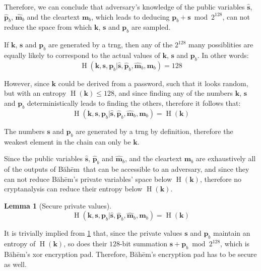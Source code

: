 \documentclass[twocolumn,hidelinks]{article}
\newcommand{\baheem}{Băhēm}
\DeclareMathOperator{\entropy}{H}
\newtheorem{lemma}{Lemma}
\begin{document}
Therefore, we can conclude that adversary's knowledge of the public
variables $\mathbf{\hat s}$, $\mathbf{\hat p}_b$, $\mathbf{\hat m}_b$ and
the cleartext $\mathbf{m}_b$, which leads to deducing $\mathbf{p}_b +
\mathbf{s} \bmod{2^{128}}$, can not reduce the space from which
$\mathbf{k}$, $\mathbf{s}$ and $\mathbf{p}_b$ are sampled.

If $\mathbf{k}$, $\mathbf{s}$ and $\mathbf{p}_b$ are generated by a
\gls{trng}, then any of the $2^{128}$ many possiblities are equally likely
to correspond to the actual values of $\mathbf{k}$, $\mathbf{s}$ and
$\mathbf{p}_b$.  In other words:
\[
    \entropy(\mathbf{k},\mathbf{s},\mathbf{p}_b
        | \mathbf{\hat s},
          \mathbf{\hat p}_b,
          \mathbf{\hat m}_b,
          \mathbf{m}_b
    )
    = 128
\]

However, since $\mathbf{k}$ could be derived from a password, such that it
looks random, but with an entropy $\entropy(\mathbf{k}) \le 128$, and since
finding any of the numbers $\mathbf{k}$, $\mathbf{s}$ and $\mathbf{p}_b$
deterministically leads to finding the others, therefore it follows that:
\[
    \entropy(\mathbf{k},\mathbf{s},\mathbf{p}_b
        | \mathbf{\hat s},
          \mathbf{\hat p}_b,
          \mathbf{\hat m}_b,
          \mathbf{m}_b
    )
    = \entropy(\mathbf{k})
\]

The numbers $\mathbf{s}$ and $\mathbf{p}_b$ are generated by a \gls{trng}
by definition, therefore the weakest element in the chain can only be
$\mathbf{k}$.

Since the public variables $\mathbf{\hat s}$, $\mathbf{\hat p}_b$ and
$\mathbf{\hat m}_b$, and the cleartext $\mathbf{m}_b$ are exhaustively all
of the outputs of \baheem\ that can be accessible to an adversary, and
since they can not reduce \baheem's private variables' space below
$\entropy(\mathbf{k})$, therefore no cryptanalysis can reduce their entropy
below $\entropy(\mathbf{k})$.

\begin{lemma}[Secure private values]
    \[
        \entropy(\mathbf{k},\mathbf{s},\mathbf{p}_b
            | \mathbf{\hat s},
              \mathbf{\hat p}_b,
              \mathbf{\hat m}_b,
              \mathbf{m}_b
        )
        = \entropy(\mathbf{k})
    \]
    \label{thrm_baheem_secure_private_values}
\end{lemma}

It is trivially implied from \cref{thrm_baheem_secure_private_values} that,
since the private values $\mathbf{s}$ and $\mathbf{p}_b$ maintain an
entropy of $\entropy(\mathbf{k})$, so does their $128$-bit summation
$\mathbf{s} + \mathbf{p}_b \bmod{2^{128}}$, which is \baheem's \gls{xor}
encryption pad.  Therefore, \baheem's encryption pad has to be secure as
well.
\end{document}
